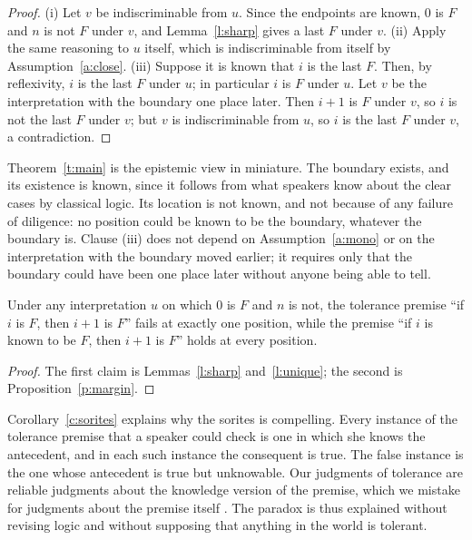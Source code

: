 \documentclass{situationist-preprint}
\begin{document}
\begin{proof}
(i) Let $v$ be indiscriminable from $u$. Since the endpoints are known, $0$ is $F$ and $n$ is not $F$ under $v$, and Lemma~\ref{l:sharp} gives a last $F$ under $v$. (ii) Apply the same reasoning to $u$ itself, which is indiscriminable from itself by Assumption~\ref{a:close}. (iii) Suppose it is known that $i$ is the last $F$. Then, by reflexivity, $i$ is the last $F$ under $u$; in particular $i$ is $F$ under $u$. Let $v$ be the interpretation with the boundary one place later. Then $i + 1$ is $F$ under $v$, so $i$ is not the last $F$ under $v$; but $v$ is indiscriminable from $u$, so $i$ is the last $F$ under $v$, a contradiction.
\end{proof}

Theorem~\ref{t:main} is the epistemic view in miniature. The boundary exists, and its existence is known, since it follows from what speakers know about the clear cases by classical logic. Its location is not known, and not because of any failure of diligence: no position could be known to be the boundary, whatever the boundary is. Clause (iii) does not depend on Assumption~\ref{a:mono} or on the interpretation with the boundary moved earlier; it requires only that the boundary could have been one place later without anyone being able to tell.

\begin{corollary}\label{c:sorites}
Under any interpretation $u$ on which $0$ is $F$ and $n$ is not, the tolerance premise \enquote{if $i$ is $F$, then $i + 1$ is $F$} fails at exactly one position, while the premise \enquote{if $i$ is known to be $F$, then $i + 1$ is $F$} holds at every position.
\end{corollary}

\begin{proof}
The first claim is Lemmas~\ref{l:sharp} and~\ref{l:unique}; the second is Proposition~\ref{p:margin}.
\end{proof}

Corollary~\ref{c:sorites} explains why the sorites is compelling. Every instance of the tolerance premise that a speaker could check is one in which she knows the antecedent, and in each such instance the consequent is true. The false instance is the one whose antecedent is true but unknowable. Our judgments of tolerance are reliable judgments about the knowledge version of the premise, which we mistake for judgments about the premise itself \citep[ch.~8]{Williamson1994}. The paradox is thus explained without revising logic and without supposing that anything in the world is tolerant.
\end{document}
